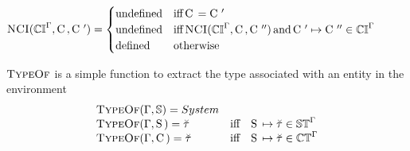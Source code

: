 \documentclass{article}
\begin{document}
\begin{math}
  \text{\sc NCI}(\mathbb{CI}^{\Gamma}, \mathop{\textrm{C}}\,, \mathop{\textrm{C}}\,') =
  \begin{cases}
    \text{undefined} & \mathop{\text{iff}} \mathop{\textrm{C}}\, = \mathop{\textrm{C}}\,' \\ 
    \text{undefined} &\mathop{\text{iff}} \text{\sc NCI}(\mathbb{CI}^{\Gamma}, \mathop{\textrm{C}}\,, \mathop{\textrm{C}}\,'')
      \mathop{\text{and}} \mathop{\textrm{C}}\,' \mapsto \mathop{\textrm{C}}\,'' \in \mathbb{CI}^{\Gamma} \\ 
    \text{defined} & \textrm{otherwise}  
  \end{cases}
\end{math}

$\text{\sc TypeOf}$ is a simple function to extract the type associated with an entity in the environment
\begin{displaymath}
  \begin{array}{l l l}
    \text{\sc TypeOf}(\Gamma, \mathbb{S}) = System \\
    \text{\sc TypeOf}(\Gamma, \mathop{\textrm{S}}\,) = \breve{\tau} & \mathop{\text{iff}} & \mathop{\textrm{S}}\, \mapsto \breve{\tau} \in \mathbb{ST}^{\Gamma} \\ 
    \text{\sc TypeOf}(\Gamma, \mathop{\textrm{C}}\,) = \breve{\tau} & \mathop{\text{iff}} & \mathop{\textrm{S}}\, \mapsto \breve{\tau} \in \mathbb{CT}^{\Gamma} \\ 
  \end{array} 
\end{displaymath}
\end{document}
